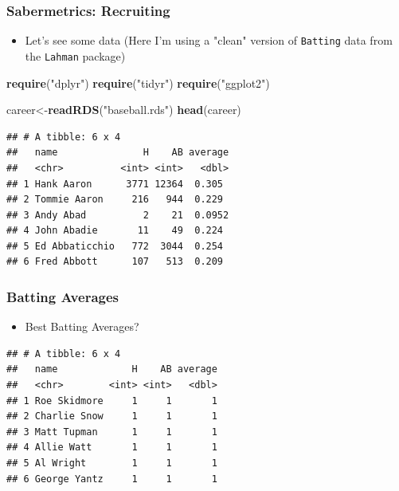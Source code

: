 \documentclass[
  shownotes,
  xcolor={svgnames},
  hyperref={colorlinks,citecolor=DarkBlue,linkcolor=DarkRed,urlcolor=DarkBlue}
  , aspectratio=169]{beamer}
\newenvironment{Shaded}{\begin{snugshade}}{\end{snugshade}}
\newcommand{\KeywordTok}[1]{\textcolor[rgb]{0.13,0.29,0.53}{\textbf{#1}}}
\newcommand{\NormalTok}[1]{#1}
\newcommand{\StringTok}[1]{\textcolor[rgb]{0.31,0.60,0.02}{#1}}
\begin{document}
\begin{frame}[fragile]
\frametitle{Sabermetrics: Recruiting}

\begin{itemize}
  \item Let's see some data {\tiny   (Here I'm using a "clean" version of \texttt{Batting} data from the \texttt{Lahman} package)}
\end{itemize}


\tiny
\begin{Shaded}
\begin{Highlighting}[]
\tiny
\KeywordTok{require}\NormalTok{(}\StringTok{"dplyr"}\NormalTok{) }
\KeywordTok{require}\NormalTok{(}\StringTok{"tidyr"}\NormalTok{) }
\KeywordTok{require}\NormalTok{(}\StringTok{"ggplot2"}\NormalTok{) }
\end{Highlighting}
\end{Shaded}


\begin{Shaded}
\begin{Highlighting}[]
\NormalTok{career\textless{}{-}}\KeywordTok{readRDS}\NormalTok{(}\StringTok{"baseball.rds"}\NormalTok{)}
\KeywordTok{head}\NormalTok{(career)}
\end{Highlighting}
\end{Shaded}

\begin{small}
\begin{verbatim}
## # A tibble: 6 x 4
##   name               H    AB average
##   <chr>          <int> <int>   <dbl>
## 1 Hank Aaron      3771 12364  0.305 
## 2 Tommie Aaron     216   944  0.229 
## 3 Andy Abad          2    21  0.0952
## 4 John Abadie       11    49  0.224 
## 5 Ed Abbaticchio   772  3044  0.254 
## 6 Fred Abbott      107   513  0.209
\end{verbatim}
\end{small}

\end{frame}

\begin{frame}[fragile]
\frametitle{Batting Averages}

\begin{itemize}
  \item Best Batting Averages?
\end{itemize} 

\begin{small}
\begin{verbatim}
## # A tibble: 6 x 4
##   name             H    AB average
##   <chr>        <int> <int>   <dbl>
## 1 Roe Skidmore     1     1       1
## 2 Charlie Snow     1     1       1
## 3 Matt Tupman      1     1       1
## 4 Allie Watt       1     1       1
## 5 Al Wright        1     1       1
## 6 George Yantz     1     1       1
\end{verbatim}
\end{small}

\end{frame}
\end{document}
